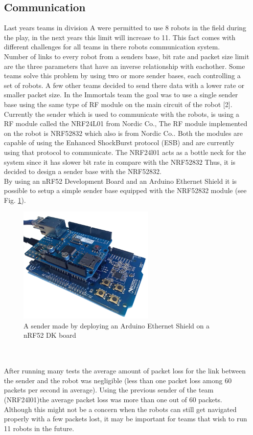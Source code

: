 \subsection{Communication}
Last years teams in division A were permitted to use 8 robots in the field during the play, in the next years this limit will increase to 11. This fact comes with different challenges for all teams in there robots communication system.\\
Number of links to every robot from a senders base, bit rate and packet size limit are the three parameters that have an inverse relationship with eachother. Some teams solve this problem by using two or more sender bases, each controlling a set of robots. A few other teams decided to send there data with a lower rate or smaller packet size. In the Immortals team the goal was to use a single sender base using the same type of RF module on the main circuit of the robot [2]. Currently the sender which is used to communicate with the robots, is using a RF module called the NRF24L01 from Nordic Co., The RF module implemented on the robot is NRF52832 which also is from Nordic Co.. Both the modules are capable of using the Enhanced ShockBurst protocol (ESB) and are currently using that protocol to communicate. The NRF24l01 acts as a bottle neck for the system since it has slower bit rate in compare with the NRF52832 Thus, it is decided to design a sender base with the NRF52832.\\
By using an nRF52 Development Board and an Arduino Ethernet Shield it is possible to setup a simple sender base equipped with the NRF52832 module (see Fig. \ref{fig:SIMPLE_SENDER}).\\
\begin{figure}
	\centering
	\includegraphics[width=0.6\textwidth]{images/NRF52832DK_ETH.png}
	\caption{A sender made by deploying an Arduino Ethernet Shield on a nRF52 DK board}
	\label{fig:SIMPLE_SENDER}
\end{figure}\\
\\
After running many tests the average amount of packet loss for the link between the sender and the robot was negligible (less than one packet loss among 60 packets per second in average). Using the previous sender of the team (NRF24l01)the average packet loss was more than one out of 60 packets. Although this might not be a concern when the robots can still get navigated properly with a few packets lost, it may be important for teams that wish to run 11 robots in the future.\\

